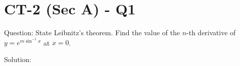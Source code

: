\documentclass[11pt, a4paper]{article}
\begin{document}

\section*{CT-2 (Sec A) - Q1}

Question:
State Leibnitz's theorem. Find the value of the $n$-th derivative of $y = e^{m\sin^{-1}x}$ at $x = 0$.

Solution:
\end{document}
